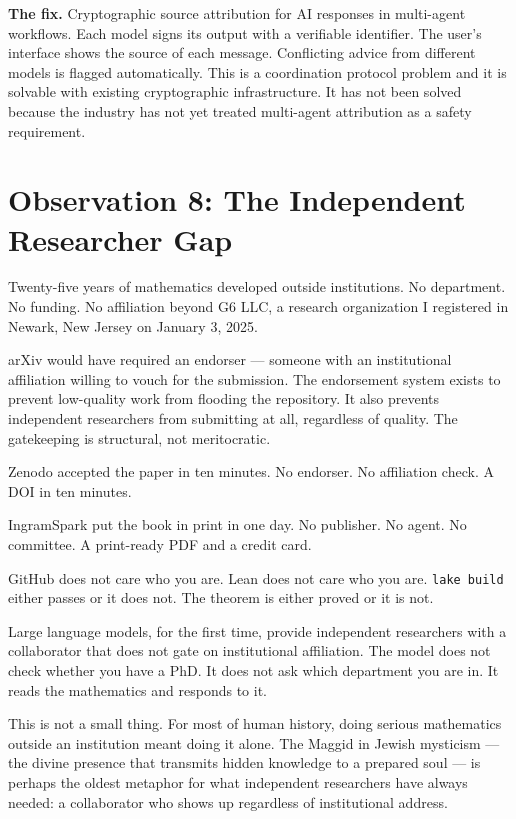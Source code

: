 \documentclass[19pt]{book}
\theoremstyle{plain}
\theoremstyle{definition}
\theoremstyle{remark}
\begin{document}
\textbf{The fix.} Cryptographic source attribution for AI
responses in multi-agent workflows. Each model signs its output
with a verifiable identifier. The user's interface shows the
source of each message. Conflicting advice from different models
is flagged automatically. This is a coordination protocol
problem and it is solvable with existing cryptographic
infrastructure. It has not been solved because the industry
has not yet treated multi-agent attribution as a safety
requirement.

\section{Observation 8: The Independent Researcher Gap}
\label{sec:independent}

Twenty-five years of mathematics developed outside institutions.
No department. No funding. No affiliation beyond G6 LLC, a
research organization I registered in Newark, New Jersey on
January 3, 2025.

arXiv would have required an endorser --- someone with an
institutional affiliation willing to vouch for the submission.
The endorsement system exists to prevent low-quality work from
flooding the repository. It also prevents independent researchers
from submitting at all, regardless of quality. The gatekeeping
is structural, not meritocratic.

Zenodo accepted the paper in ten minutes. No endorser. No
affiliation check. A DOI in ten minutes.

IngramSpark put the book in print in one day. No publisher.
No agent. No committee. A print-ready PDF and a credit card.

GitHub does not care who you are. Lean does not care who you are.
\texttt{lake build} either passes or it does not. The theorem
is either proved or it is not.

Large language models, for the first time, provide independent
researchers with a collaborator that does not gate on
institutional affiliation. The model does not check whether
you have a PhD. It does not ask which department you are in.
It reads the mathematics and responds to it.

This is not a small thing. For most of human history, doing
serious mathematics outside an institution meant doing it alone.
The Maggid in Jewish mysticism --- the divine presence that
transmits hidden knowledge to a prepared soul --- is perhaps
the oldest metaphor for what independent researchers have always
needed: a collaborator who shows up regardless of institutional
address.
\end{document}
